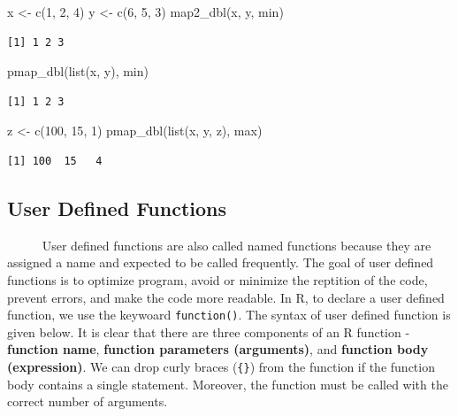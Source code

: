 \documentclass[
  letterpaper,
  DIV=11,
  numbers=noendperiod]{scrreprt}
\newenvironment{Shaded}{\begin{snugshade}}{\end{snugshade}}
\newcommand{\DecValTok}[1]{\textcolor[rgb]{0.68,0.00,0.00}{#1}}
\newcommand{\FunctionTok}[1]{\textcolor[rgb]{0.28,0.35,0.67}{#1}}
\newcommand{\NormalTok}[1]{\textcolor[rgb]{0.00,0.23,0.31}{#1}}
\newcommand{\OtherTok}[1]{\textcolor[rgb]{0.00,0.23,0.31}{#1}}
\begin{document}
\begin{Shaded}
\begin{Highlighting}[]
\NormalTok{x }\OtherTok{\textless{}{-}} \FunctionTok{c}\NormalTok{(}\DecValTok{1}\NormalTok{, }\DecValTok{2}\NormalTok{, }\DecValTok{4}\NormalTok{)}
\NormalTok{y }\OtherTok{\textless{}{-}} \FunctionTok{c}\NormalTok{(}\DecValTok{6}\NormalTok{, }\DecValTok{5}\NormalTok{, }\DecValTok{3}\NormalTok{)}
\FunctionTok{map2\_dbl}\NormalTok{(x, y, min)}
\end{Highlighting}
\end{Shaded}

\begin{verbatim}
[1] 1 2 3
\end{verbatim}

\begin{Shaded}
\begin{Highlighting}[]
\FunctionTok{pmap\_dbl}\NormalTok{(}\FunctionTok{list}\NormalTok{(x, y), min)}
\end{Highlighting}
\end{Shaded}

\begin{verbatim}
[1] 1 2 3
\end{verbatim}

\begin{Shaded}
\begin{Highlighting}[]
\NormalTok{z }\OtherTok{\textless{}{-}} \FunctionTok{c}\NormalTok{(}\DecValTok{100}\NormalTok{, }\DecValTok{15}\NormalTok{, }\DecValTok{1}\NormalTok{)}
\FunctionTok{pmap\_dbl}\NormalTok{(}\FunctionTok{list}\NormalTok{(x, y, z), max)}
\end{Highlighting}
\end{Shaded}

\begin{verbatim}
[1] 100  15   4
\end{verbatim}

\subsection{User Defined Functions}\label{user-defined-functions}

~~~~~ User defined functions are also called named functions because
they are assigned a name and expected to be called frequently. The goal
of user defined functions is to optimize program, avoid or minimize the
reptition of the code, prevent errors, and make the code more readable.
In R, to declare a user defined function, we use the keywoard
\texttt{function()}. The syntax of user defined function is given below.
It is clear that there are three components of an R function -
\textbf{function name}, \textbf{function parameters (arguments)}, and
\textbf{function body (expression)}. We can drop curly braces
(\texttt{\{\}}) from the function if the function body contains a single
statement. Moreover, the function must be called with the correct number
of arguments.
\end{document}
